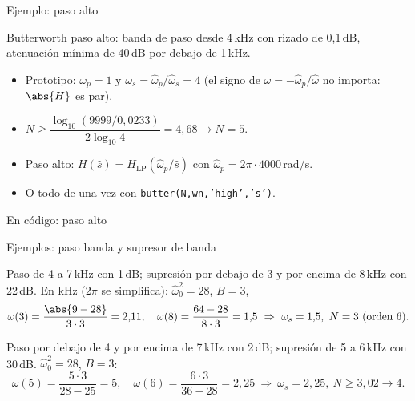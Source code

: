 \documentclass[aspectratio=169,11pt]{beamer}
\begin{document}
\begin{frame}{Ejemplo: paso alto}
  \begin{ejemplo}[Enunciado]
    Butterworth paso alto: banda de paso desde 4\,kHz con rizado de 0,1\,dB, atenuación mínima de 40\,dB por debajo de 1\,kHz.
  \end{ejemplo}
  \begin{itemize}
    \item Prototipo: $\omega_p=1$ y $\omega_s=\hat\omega_p/\hat\omega_s=4$ (el signo de $\omega=-\hat\omega_p/\hat\omega$ no importa: $\abs{H}$ es par).
    \item $N\ge\dfrac{\log_{10}(9999/0{,}0233)}{2\log_{10}4}=4{,}68\to N=5$.
    \item Paso alto: $H(\hat s)=H_{\text{LP}}(\hat\omega_p/\hat s)$ con $\hat\omega_p=2\pi\cdot4000$\,rad/s.
    \item O todo de una vez con \texttt{butter(N,wn,'high','s')}.
  \end{itemize}
\end{frame}

\begin{frame}{En código: paso alto}
\end{frame}

\begin{frame}{Ejemplos: paso banda y supresor de banda}
  \small
  \begin{ejemplo}
    Paso de 4 a 7\,kHz con 1\,dB; supresión por debajo de 3 y por encima de 8\,kHz con 22\,dB. En kHz ($2\pi$ se simplifica): $\hat\omega_0^2=28$, $B=3$,
    \[
      \omega(3)=\frac{\abs{9-28}}{3\cdot3}=2{,}11,\quad \omega(8)=\frac{64-28}{8\cdot3}=1{,}5\ \Rightarrow\ \omega_s=1{,}5,\ N=3\ \text{(orden 6)}.
    \]
  \end{ejemplo}
  \begin{ejemplo}
    Paso por debajo de 4 y por encima de 7\,kHz con 2\,dB; supresión de 5 a 6\,kHz con 30\,dB. $\hat\omega_0^2=28$, $B=3$:
    \[
      \omega(5)=\frac{5\cdot3}{28-25}=5,\quad \omega(6)=\frac{6\cdot3}{36-28}=2{,}25\ \Rightarrow\ \omega_s=2{,}25,\ N\ge3{,}02\to4.
    \]
  \end{ejemplo}
\end{frame}
\end{document}

